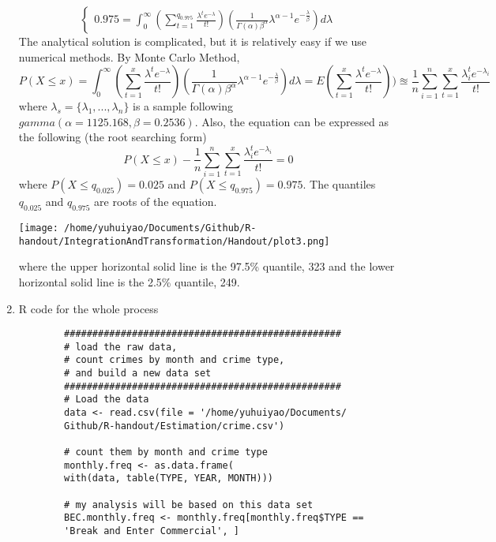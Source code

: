 \begin{enumerate}
\begin{equation*}
\begin{cases}
		0.975 = \int_{0}^{\infty}(\sum_{t = 1}^{q_{0.975}}\frac{\lambda^{t}e^{-\lambda}}{t!})(\frac{1}{\Gamma(\alpha)\beta^{\alpha}}\lambda^{\alpha - 1}e^{-\frac{\lambda}{\beta}}) d \lambda
		\end{cases}
	\end{equation*}
	The analytical solution is complicated, but it is relatively easy if we use numerical methods. By Monte Carlo Method,
	\begin{equation*}
		P(X \le x) = \int_{0}^{\infty}(\sum_{t = 1}^{x}\frac{\lambda^{t}e^{-\lambda}}{t!})(\frac{1}{\Gamma(\alpha)\beta^{\alpha}}\lambda^{\alpha - 1}e^{-\frac{\lambda}{\beta}}) d \lambda = E(\sum_{t = 1}^{x}\frac{\lambda^{t}e^{-\lambda}}{t!})) \approxeq \frac{1}{n} \sum_{i = 1}^{n} \sum_{t = 1}^{x}\frac{\lambda_i^{t}e^{-\lambda_i}}{t!}
	\end{equation*}
	where $\lambda_s = \{\lambda_1,...,\lambda_n \}$ is a sample following $gamma(\alpha= 1125.168, \beta = 0.2536)$. Also, the equation can be expressed as the following (the root searching form)
	\begin{equation*}
		P(X \le x) - \frac{1}{n} \sum_{i = 1}^{n} \sum_{t = 1}^{x}\frac{\lambda_i^{t}e^{-\lambda_i}}{t!} = 0
	\end{equation*}
	where $P(X \le q_{0.025}) = 0.025$ and $P(X \le  q_{0.975}) = 0.975$. The quantiles $q_{0.025}$ and $q_{0.975}$ are roots of the equation. 
	\begin{center}
		\texttt{[image: /home/yuhuiyao/Documents/Github/R-handout/IntegrationAndTransformation/Handout/plot3.png]}
	\end{center}
	where the upper horizontal solid line is the 97.5\% quantile, 323 and the lower horizontal solid line is the 2.5\% quantile, 249.
	\item R code for the whole process
	\begin{verbatim}
		#################################################
		# load the raw data, 
		# count crimes by month and crime type, 
		# and build a new data set
		#################################################
		# Load the data
		data <- read.csv(file = '/home/yuhuiyao/Documents/
		Github/R-handout/Estimation/crime.csv') 
		
		# count them by month and crime type
		monthly.freq <- as.data.frame(
		with(data, table(TYPE, YEAR, MONTH)))
		
		# my analysis will be based on this data set
		BEC.monthly.freq <- monthly.freq[monthly.freq$TYPE == 
		'Break and Enter Commercial', ]
		

\end{verbatim}
\end{enumerate}
